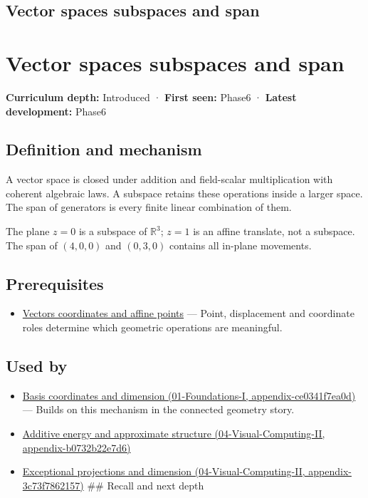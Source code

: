 \hypertarget{appendix-173b52c063ae}{}
\section*{Vector spaces subspaces and span}
\chapter{Vector spaces subspaces and span}\label{appendix-173b52c063ae-vector-spaces-subspaces-and-span}

\textbf{Curriculum depth:} Introduced · \textbf{First seen:} Phase6 · \textbf{Latest development:} Phase6

\section{Definition and mechanism}\label{appendix-173b52c063ae-definition-and-mechanism}

A vector space is closed under addition and field-scalar multiplication with coherent algebraic laws. A subspace retains these operations inside a larger space. The span of generators is every finite linear combination of them.

The plane \(z=0\) is a subspace of \(\mathbb R^3\); \(z=1\) is an affine translate, not a subspace. The span of \((4,0,0)\) and \((0,3,0)\) contains all in-plane movements.

\section{Prerequisites}\label{appendix-173b52c063ae-prerequisites}

\begin{itemize}
\tightlist
\item
  \hyperref[appendix-0659864c0aa3]{Vectors coordinates and affine points} --- Point, displacement and coordinate roles determine which geometric operations are meaningful.
\end{itemize}

\section{Used by}\label{appendix-173b52c063ae-used-by}

\begin{itemize}
\item
  \href{../01-Foundations-I/main.pdf\#nameddest=appendix-ce0341f7ea0d}{Basis coordinates and dimension (01-Foundations-I, appendix-ce0341f7ea0d)} --- Builds on this mechanism in the connected geometry story.
\item
  \href{../04-Visual-Computing-II/main.pdf\#nameddest=appendix-b0732b22e7d6}{Additive energy and approximate structure (04-Visual-Computing-II, appendix-b0732b22e7d6)}
\item
  \href{../04-Visual-Computing-II/main.pdf\#nameddest=appendix-3c73f7862157}{Exceptional projections and dimension (04-Visual-Computing-II, appendix-3c73f7862157)} \#\# Recall and next depth
\end{itemize}

